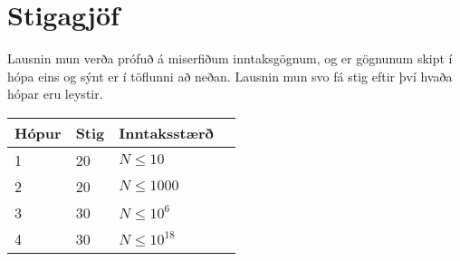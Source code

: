 \section*{Stigagjöf}
Lausnin mun verða prófuð á miserfiðum inntaksgögnum, og er gögnunum skipt í
hópa eins og sýnt er í töflunni að neðan. Lausnin mun svo fá stig eftir því
hvaða hópar eru leystir.

\begin{tabular}{|l|l|l|l|}
\hline
Hópur & Stig & Inntaksstærð \\ \hline
1     & 20   & $N \le 10$ \\ \hline
2     & 20   & $N \le 1000$ \\ \hline
3     & 30   & $N \le 10^6$ \\ \hline
4     & 30   & $N \le 10^{18}$ \\ \hline
\end{tabular}


